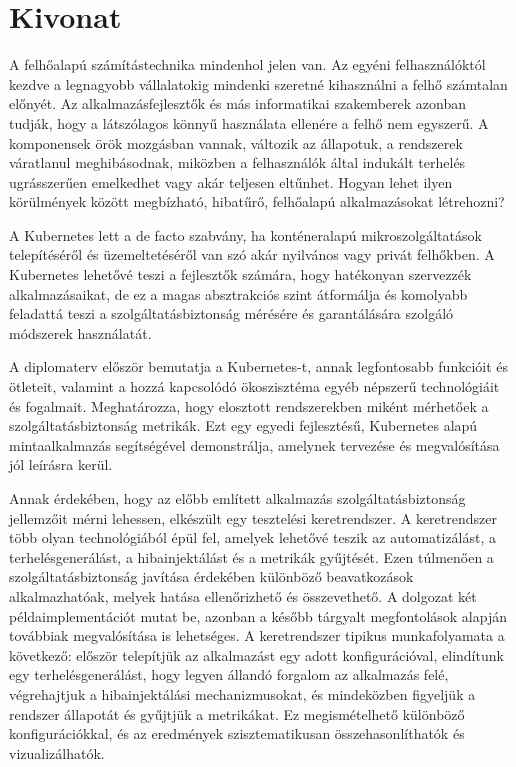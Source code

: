 \setcounter{page}{1}

\selecthungarian

\chapter*{Kivonat}

A felhőalapú számítástechnika mindenhol jelen van. Az egyéni felhasználóktól kezdve a legnagyobb vállalatokig mindenki szeretné kihasználni a felhő számtalan előnyét. Az alkalmazásfejlesztők és más informatikai szakemberek azonban tudják, hogy a látszólagos könnyű használata ellenére a felhő nem egyszerű. A komponensek örök mozgásban vannak, változik az állapotuk, a rendszerek váratlanul meghibásodnak, miközben a felhasználók által indukált terhelés ugrásszerűen emelkedhet vagy akár teljesen eltűnhet. Hogyan lehet ilyen körülmények között megbízható, hibatűrő, felhőalapú alkalmazásokat létrehozni?

A Kubernetes lett a de facto szabvány, ha konténeralapú mikroszolgáltatások telepítéséről és üzemeltetéséről van szó akár nyilvános vagy privát felhőkben. A Kubernetes lehetővé teszi a fejlesztők számára, hogy hatékonyan szervezzék alkalmazásaikat, de ez a magas absztrakciós szint átformálja és komolyabb feladattá teszi a szolgáltatásbiztonság mérésére és garantálására szolgáló módszerek használatát.

A diplomaterv először bemutatja a Kubernetes-t, annak legfontosabb funkcióit és ötleteit, valamint a hozzá kapcsolódó ökoszisztéma egyéb népszerű technológiáit és fogalmait. Meghatározza, hogy elosztott rendszerekben miként mérhetőek a szolgáltatásbiztonság metrikák. Ezt egy egyedi fejlesztésű, Kubernetes alapú mintaalkalmazás segítségével demonstrálja, amelynek tervezése és megvalósítása jól leírásra kerül.

Annak érdekében, hogy az előbb említett alkalmazás szolgáltatásbiztonság jellemzőit mérni lehessen, elkészült egy tesztelési keretrendszer. A keretrendszer több olyan technológiából épül fel, amelyek lehetővé teszik az automatizálást, a terhelésgenerálást, a hibainjektálást és a metrikák gyűjtését. Ezen túlmenően a szolgáltatásbiztonság javítása érdekében különböző beavatkozások alkalmazhatóak, melyek hatása ellenőrizhető és összevethető. A dolgozat két példaimplementációt mutat be, azonban a később tárgyalt megfontolások alapján továbbiak megvalósítása is lehetséges. A keretrendszer tipikus munkafolyamata a következő: először telepítjük az alkalmazást egy adott konfigurációval, elindítunk egy terhelésgenerálást, hogy legyen állandó forgalom az alkalmazás felé, végrehajtjuk a hibainjektálási mechanizmusokat, és mindeközben figyeljük a rendszer állapotát és gyűjtjük a metrikákat. Ez megismételhető különböző konfigurációkkal, és az eredmények szisztematikusan összehasonlíthatók és vizualizálhatók.


